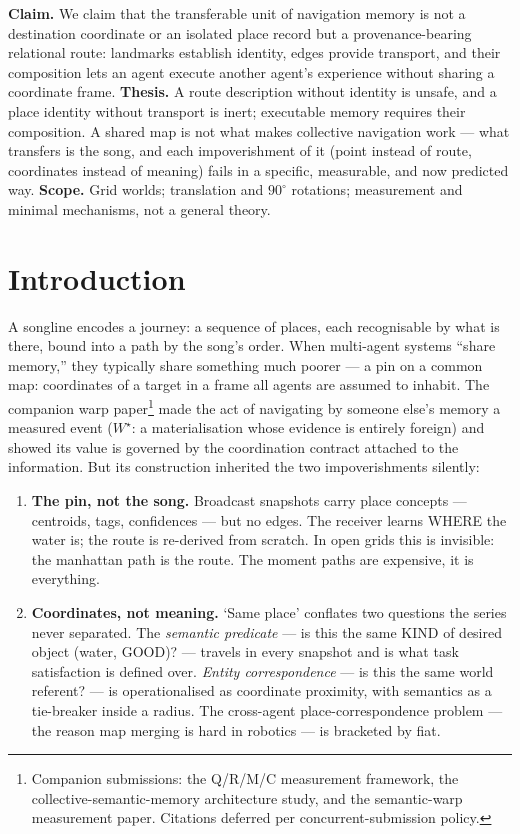 \documentclass{article}
\newcommand{\wstar}{W^{\star}}
\begin{document}
\textbf{Claim.} We claim that the transferable unit of navigation memory is not a destination coordinate or an isolated place record but a provenance-bearing relational route: landmarks establish identity, edges provide transport, and their composition lets an agent execute another agent's experience without sharing a coordinate frame.
\textbf{Thesis.} A route description without identity is unsafe, and a place identity without transport is inert; executable memory requires their composition. A shared map is not what makes collective navigation work --- what transfers is the song, and each impoverishment of it (point instead of route, coordinates instead of meaning) fails in a specific, measurable, and now predicted way.
\textbf{Scope.} Grid worlds; translation and $90^\circ$ rotations; measurement and minimal mechanisms, not a general theory.

\FloatBarrier
\section{Introduction}
\label{p3:sec:intro}

A songline encodes a journey: a sequence of places, each recognisable
by what is there, bound into a path by the song's order. When
multi-agent systems ``share memory,'' they typically share something
much poorer --- a pin on a common map: coordinates of a target in a
frame all agents are assumed to inhabit. The companion warp
paper\footnote{Companion submissions: the Q/R/M/C measurement
framework, the collective-semantic-memory architecture study, and the
semantic-warp measurement paper. Citations deferred per
concurrent-submission policy.} made the act of navigating by someone
else's memory a measured event ($\wstar$: a materialisation whose
evidence is entirely foreign) and showed its value is governed by the
coordination contract attached to the information. But its
construction inherited the two impoverishments silently:

\begin{enumerate}[leftmargin=20pt,itemsep=2pt,topsep=2pt]
\item \textbf{The pin, not the song.} Broadcast snapshots carry place
  concepts --- centroids, tags, confidences --- but no edges. The
  receiver learns WHERE the water is; the route is re-derived from
  scratch. In open grids this is invisible: the manhattan path is the
  route. The moment paths are expensive, it is everything.
\item \textbf{Coordinates, not meaning.} `Same place' conflates two
  questions the series never separated. The \emph{semantic predicate}
  --- is this the same KIND of desired object (water, GOOD)? ---
  travels in every snapshot and is what task satisfaction is defined
  over. \emph{Entity correspondence} --- is this the same world
  referent? --- is operationalised as coordinate proximity, with
  semantics as a tie-breaker inside a radius. The cross-agent
  place-correspondence problem --- the reason map merging is hard in
  robotics --- is bracketed by fiat.
\end{enumerate}
\end{document}
